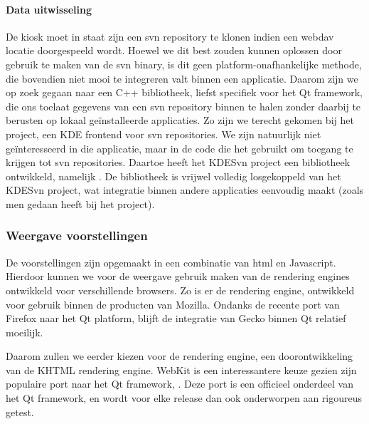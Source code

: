 \paragraph{Data uitwisseling} De kiosk moet in staat zijn een \ac{svn} repository te klonen indien een \ac{webdav} locatie doorgespeeld wordt. Hoewel we dit best zouden kunnen oplossen door gebruik te maken van de \ac{svn} binary, is dit geen platform-onafhankelijke methode, die bovendien niet mooi te integreren valt binnen een applicatie. Daarom zijn we op zoek gegaan naar een C++ bibliotheek, liefst specifiek voor het Qt framework, die ons toelaat gegevens van een \ac{svn} repository binnen te halen zonder daarbij te berusten op lokaal geïnstalleerde applicaties. Zo zijn we terecht gekomen bij het  project, een KDE frontend voor \ac{svn} repositories. We zijn natuurlijk niet geïnteresseerd in die applicatie, maar in de code die het gebruikt om toegang te krijgen tot \ac{svn} repositories. Daartoe heeft het KDESvn project een bibliotheek ontwikkeld, namelijk . De bibliotheek is vrijwel volledig losgekoppeld van het KDESvn project, wat integratie binnen andere applicaties eenvoudig maakt (zoals men gedaan heeft bij het  project).

\subsubsection{Weergave voorstellingen}

De voorstellingen zijn opgemaakt in een combinatie van \ac{html} en Javascript. Hierdoor kunnen we voor de weergave gebruik maken van de rendering engines ontwikkeld voor verschillende browsers. Zo is er de  rendering engine, ontwikkeld voor gebruik binnen de producten van Mozilla. Ondanks de recente port van Firefox naar het Qt platform, blijft de integratie van Gecko binnen Qt relatief moeilijk.

Daarom zullen we eerder kiezen voor de  rendering engine, een doorontwikkeling van de KHTML rendering engine. WebKit is een interessantere keuze gezien zijn populaire port naar het Qt framework, . Deze port is een officieel onderdeel van het Qt framework, en wordt voor elke release dan ook onderworpen aan rigoureus getest.

